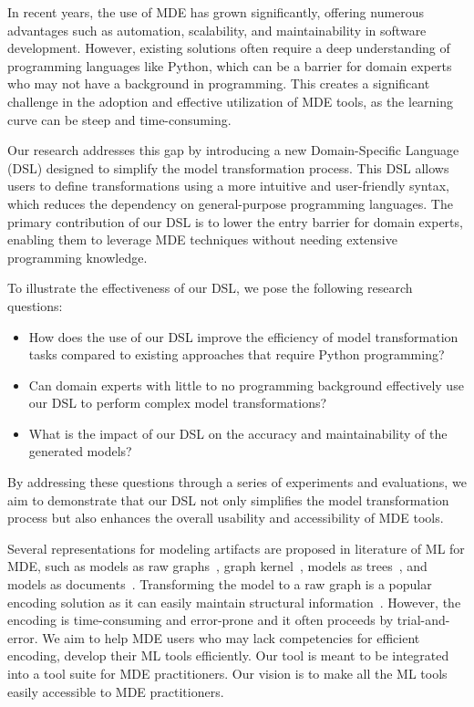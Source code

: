\documentclass[journal,article,submit,moreauthors,technologies]{Definitions/mdpi}
\begin{document}
In recent years, the use of MDE has grown significantly, offering numerous advantages such as automation, scalability, and maintainability in software development. However, existing solutions often require a deep understanding of programming languages like Python, which can be a barrier for domain experts who may not have a background in programming. This creates a significant challenge in the adoption and effective utilization of MDE tools, as the learning curve can be steep and time-consuming.

Our research addresses this gap by introducing a new Domain-Specific Language (DSL) designed to simplify the model transformation process. This DSL allows users to define transformations using a more intuitive and user-friendly syntax, which reduces the dependency on general-purpose programming languages. The primary contribution of our DSL is to lower the entry barrier for domain experts, enabling them to leverage MDE techniques without needing extensive programming knowledge.

To illustrate the effectiveness of our DSL, we pose the following research questions:
\begin{itemize}
    \item How does the use of our DSL improve the efficiency of model transformation tasks compared to existing approaches that require Python programming?
    \item Can domain experts with little to no programming background effectively use our DSL to perform complex model transformations?
    \item What is the impact of our DSL on the accuracy and maintainability of the generated models?
\end{itemize}

By addressing these questions through a series of experiments and evaluations, we aim to demonstrate that our DSL not only simplifies the model transformation process but also enhances the overall usability and accessibility of MDE tools.

Several representations for modeling artifacts are proposed in literature of ML for MDE, such as models as raw graphs~\cite{lopez2022generating}, graph kernel~\cite{clariso2018applying}, models as trees~\cite{burgueno2019lstm}, and models as documents~\cite{nguyen2019automated, basciani2016automated}. Transforming the model to a raw graph is a popular encoding solution as it can easily maintain structural information~\cite{ali2023encoding}. However, the encoding is time-consuming and error-prone and it often proceeds by trial-and-error. We aim to help MDE users who may lack competencies for efficient encoding, develop their ML tools efficiently. Our tool is meant to be integrated into a tool suite for MDE practitioners. Our vision is to make all the ML tools easily accessible to MDE practitioners.
\end{document}
